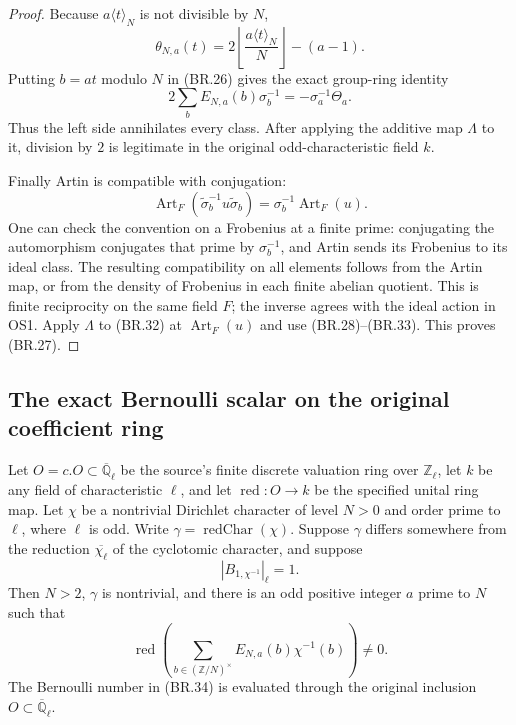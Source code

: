 \begin{proof}
Because $a\langle t\rangle_N$ is not divisible by $N$,
\[
 \theta_{N,a}(t)=
       2\left\lfloor\frac{a\langle t\rangle_N}{N}\right\rfloor
                  -(a-1).
 \tag{BR.31}
\]
Putting $b=at$ modulo $N$ in (BR.26) gives the exact group-ring
identity
\[
 2\sum_b E_{N,a}(b)\sigma_b^{-1}
                       =-\sigma_a^{-1}\Theta_a.
 \tag{BR.32}
\]
Thus the left side annihilates every class.
After applying the additive map $\Lambda$ to it, division by
$2$ is legitimate in the original odd-characteristic field $k$.

Finally Artin is compatible with conjugation:
\[
 \operatorname{Art}_F(\widetilde\sigma_b^{-1}u
                         \widetilde\sigma_b)
                   =\sigma_b^{-1}\operatorname{Art}_F(u).
 \tag{BR.33}
\]
One can check the convention on a Frobenius at a finite prime:
conjugating the automorphism conjugates that prime by
$\sigma_b^{-1}$, and Artin sends its Frobenius to its ideal class.
The resulting compatibility on all elements follows from the
Artin map, or from the density of Frobenius in each finite abelian
quotient.  This is finite reciprocity on the same field $F$;
the inverse agrees with the ideal action in OS1.
Apply $\Lambda$ to (BR.32) at
$\operatorname{Art}_F(u)$ and use (BR.28)--(BR.33).
This proves (BR.27).
\end{proof}

\subsection{The exact Bernoulli scalar on the original coefficient ring}

\begin{proposition}
\label{prop:br-scalar}
Let $O=c.O\subset\overline{\mathbb Q}_\ell$ be the source's finite
discrete valuation ring over $\mathbb Z_\ell$, let $k$ be any field
of characteristic $\ell$, and let $\operatorname{red}:O\to k$
be the specified unital ring map.
Let $\chi$ be a nontrivial Dirichlet character of level $N>0$
and order prime to $\ell$, where $\ell$ is odd.
Write $\gamma=\operatorname{redChar}(\chi)$.
Suppose $\gamma$ differs somewhere from the reduction
$\overline{\chi_\ell}$ of the cyclotomic character, and suppose
\[
                         |B_{1,\chi^{-1}}|_\ell=1.
                         \tag{BR.34}
\]
Then $N>2$, $\gamma$ is nontrivial, and there is an odd positive
integer $a$ prime to $N$ such that
\[
 \operatorname{red}\left(
      \sum_{b\in(\mathbb Z/N)^\times}E_{N,a}(b)\chi^{-1}(b)
                    \right)\ne0.
 \tag{BR.35}
\]
The Bernoulli number in (BR.34) is evaluated through the original
inclusion $O\subset\overline{\mathbb Q}_\ell$.
\end{proposition}

